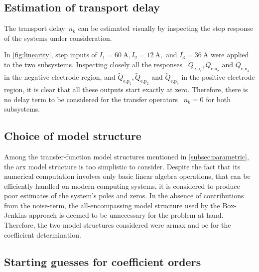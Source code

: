 \subsection{Estimation of transport delay}

The transport delay~$n_k$ can be estimated visually by inspecting the step
response of the systems under consideration.

In \cref{fig:linearity},   step  inputs   of   ${I_1   =  \SI{60}{\ampere},   I_2
=    \SI{12}{\ampere},}$   and    ${I_3   =    \SI{36}{\ampere}}$   were    applied
to    the   two    subsystems.    Inspecting   closely    all   the    responses
\ie~$\widetilde{Q}_{\text{e,n}_1},    \widetilde{Q}_{\text{e,n}_2}   $   and
$\widetilde{Q}_{\text{e,n}_3}$    in    the     negative    electrode    region,
and    $\widetilde{Q}_{\text{e,p}_1},    \widetilde{Q}_{\text{e,p}_2}   $    and
$\widetilde{Q}_{\text{e,p}_3}$  in the  positive electrode  region, it  is clear
that all these outputs start exactly at  zero. Therefore, there is no delay term
to be considered for the transfer operators \ie~${n_k = 0}$ for both subsystems.

\subsection{Choice of model structure}\label{subsec:modelstrucchoice}

Among      the      transfer-function       model      structures      mentioned
in \cref{subsec:parametric}, the \gls{arx} model  structure is too simplistic to
consider. Despite  the fact that  its numerical computation involves  only basic
linear algebra operations,  that can be efficiently handled  on modern computing
systems, it  is considered to produce  poor estimates of the  system's poles and
zeros. In the absence of contributions from the noise-term, the all-encompassing
model structure used by the Box-Jenkins approach is deemed to be unnecessary for
the  problem  at hand.  Therefore,  the  two  model structures  considered  were
\gls{armax} and \gls{oe} for the coefficient determination.

\subsection{Starting guesses for coefficient orders}\label{subsec:initguesscoefforder}

